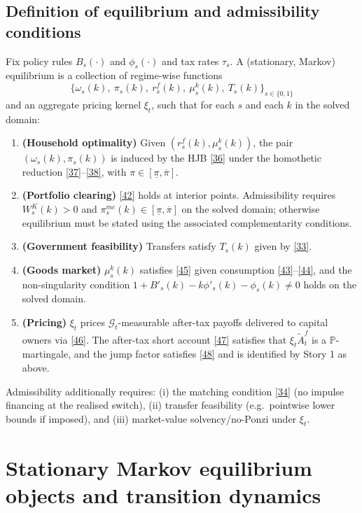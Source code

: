 \documentclass{article}
\begin{document}
\subsection{Definition of equilibrium and admissibility conditions}
Fix policy rules $B_s(\cdot)$ and $\phi_s(\cdot)$ and tax rates $\tau_s$. A (stationary, Markov)
equilibrium is a collection of regime-wise functions
\[
\Big\{\omega_s(k),\ \pi_s(k),\ r^f_s(k),\ \mu^k_s(k),\ T_s(k)\Big\}_{s\in\{0,1\}}
\]
and an aggregate pricing kernel $\xi_t$, such that for each $s$ and each $k$ in the solved domain:
\begin{enumerate}
\item \textbf{(Household optimality)} Given $(r^f_s(k),\mu^k_s(k))$, the pair $(\omega_s(k),\pi_s(k))$
is induced by the HJB \eqref{36} under the homothetic reduction \eqref{37}--\eqref{38}, with
$\pi\in[\underline\pi,\overline\pi]$.
\item \textbf{(Portfolio clearing)} \eqref{42} holds at interior points. Admissibility requires
$W^K_s(k)>0$ and $\pi^{mc}_s(k)\in[\underline\pi,\overline\pi]$ on the solved domain; otherwise
equilibrium must be stated using the associated complementarity conditions.
\item \textbf{(Government feasibility)} Transfers satisfy $T_s(k)$ given by \eqref{33}.
\item \textbf{(Goods market)} $\mu^k_s(k)$ satisfies \eqref{45} given consumption \eqref{43}--\eqref{44},
and the non-singularity condition $1+B'_s(k)-k\phi'_s(k)-\phi_s(k)\neq 0$ holds on the solved domain.
\item \textbf{(Pricing)} $\xi_t$ prices $\mathcal G_t$-measurable after-tax payoffs delivered to capital
owners via \eqref{46}. The after-tax short account \eqref{47} satisfies that $\xi_t\widetilde A^f_t$ is
a $\mathbb P$-martingale, and the jump factor satisfies \eqref{48} and is identified by Story 1 as above.
\end{enumerate}

Admissibility additionally requires:
(i) the matching condition \eqref{34} (no impulse financing at the realised switch),
(ii) transfer feasibility (e.g.\ pointwise lower bounds if imposed), and
(iii) market-value solvency/no-Ponzi under $\xi_t$.


\section{Stationary Markov equilibrium objects and transition dynamics}
\label{sec:GE_solution}
\end{document}
